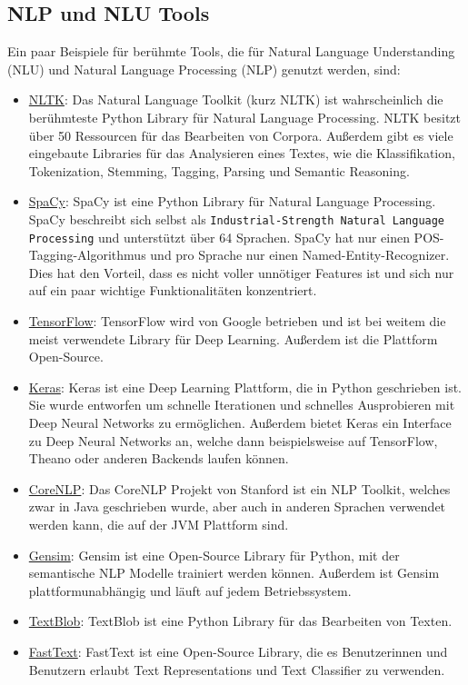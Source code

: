 \subsection{NLP und NLU Tools}\label{subsec:NLP-NLU-Tools}

Ein paar Beispiele für berühmte Tools, die für Natural Language Understanding (NLU) und Natural Language Processing (NLP) genutzt werden, sind:

\begin{itemize}
    \item \href{https://www.nltk.org/}{NLTK}: Das Natural Language Toolkit (kurz NLTK) ist wahrscheinlich die berühmteste Python Library für Natural Language Processing.
    NLTK besitzt über 50 Ressourcen für das Bearbeiten von Corpora.
    Außerdem gibt es viele eingebaute Libraries für das Analysieren eines Textes, wie die Klassifikation, Tokenization, Stemming, Tagging, Parsing und Semantic Reasoning.
    \item \href{https://spacy.io/}{SpaCy}: SpaCy ist eine Python Library für Natural Language Processing.
    SpaCy beschreibt sich selbst als \texttt{Industrial-Strength Natural Language Processing} und unterstützt über 64 Sprachen.
    SpaCy hat nur einen POS-Tagging-Algorithmus und pro Sprache nur einen Named-Entity-Recognizer.
    Dies hat den Vorteil, dass es nicht voller unnötiger Features ist und sich nur auf ein paar wichtige Funktionalitäten konzentriert.
    \item \href{https://www.tensorflow.org/}{TensorFlow}: TensorFlow wird von Google betrieben und ist bei weitem die meist verwendete Library für Deep Learning.
    Außerdem ist die Plattform Open-Source.
    \item \href{https://keras.io/}{Keras}: Keras ist eine Deep Learning Plattform, die in Python geschrieben ist.
    Sie wurde entworfen um schnelle Iterationen und schnelles Ausprobieren mit Deep Neural Networks zu ermöglichen.
    Außerdem bietet Keras ein Interface zu Deep Neural Networks an, welche dann beispielsweise auf TensorFlow, Theano oder anderen Backends laufen können.
    \item \href{https://stanfordnlp.github.io/CoreNLP/}{CoreNLP}: Das CoreNLP Projekt von Stanford ist ein NLP Toolkit, welches zwar in Java geschrieben wurde, aber auch in anderen Sprachen verwendet werden kann, die auf der JVM Plattform sind.
    \item \href{https://radimrehurek.com/gensim/}{Gensim}: Gensim ist eine Open-Source Library für Python, mit der semantische NLP Modelle trainiert werden können.
    Außerdem ist Gensim plattformunabhängig und läuft auf jedem Betriebssystem.
    \item \href{https://textblob.readthedocs.io/en/dev/}{TextBlob}: TextBlob ist eine Python Library für das Bearbeiten von Texten.
    \item \href{https://fasttext.cc/}{FastText}: FastText ist eine Open-Source Library, die es Benutzerinnen und Benutzern erlaubt Text Representations und Text Classifier zu verwenden.
\end{itemize}


